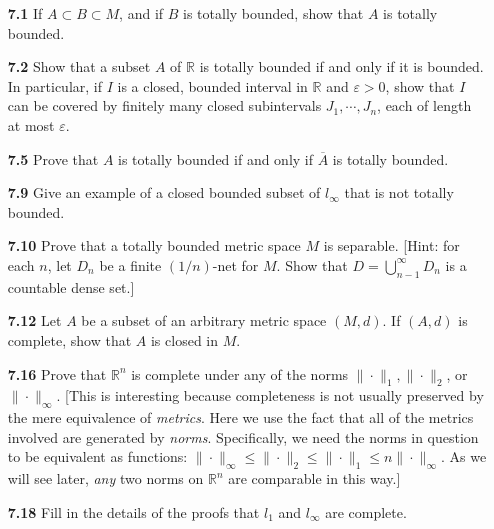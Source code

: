 \documentclass[12pt]{amsart}
\def\iff{if and only if }
\def\RR{{\mathbb R}}
\renewcommand{\epsilon}{\varepsilon}
\begin{document}
\begin{enumerate}

\item[\bf 7.1] If $A\subset B\subset M$, and if $B$ is totally bounded, show that $A$ is totally bounded.

\bigskip

\item[\bf 7.2] Show that a subset $A$ of $\RR$ is totally bounded \iff it is bounded. In particular, if $I$ is a closed, bounded interval in $\RR$ and $\epsilon>0$, show that $I$ can be covered by finitely many closed subintervals $J_1,\cdots,J_n$, each of length at most $\epsilon$.

\bigskip

\item[\bf 7.5] Prove that $A$ is totally bounded \iff $\overline A$ is totally bounded.

\bigskip

\item[\bf 7.9] Give an example of a closed bounded subset of $l_\infty$ that is not totally bounded.

\bigskip

\item[\bf 7.10] Prove that a totally bounded metric space $M$ is separable. [Hint: for each $n$, let $D_n$ be a finite $(1/n)$-net for $M$. Show that $D=\bigcup_{n-1}^\infty D_n$ is a countable dense set.]

\bigskip

\item[\bf 7.12] Let $A$ be a subset of an arbitrary metric space $(M,d)$. If $(A,d)$ is complete, show that $A$ is closed in $M$.

\bigskip

\item[\bf 7.16] Prove that $\RR^n$ is complete under any of the norms $\|\cdot\|_1, \|\cdot\|_2$, or $\|\cdot\|_\infty$. [This is interesting because completeness is not usually preserved by the mere equivalence of \textit{metrics}. Here we use the fact that all of the metrics involved are generated by \textit{norms}. Specifically, we need the norms in question to be equivalent as functions: $\|\cdot\|_\infty\leq \|\cdot\|_2\leq\|\cdot\|_1\leq n\|\cdot\|_\infty$. As we will see later, \textit{any} two norms on $\RR^n$ are comparable in this way.]

\bigskip

\item[\bf 7.18] Fill in the details of the proofs that $l_1$ and $l_\infty$ are complete.


\end{enumerate}
\end{document}
